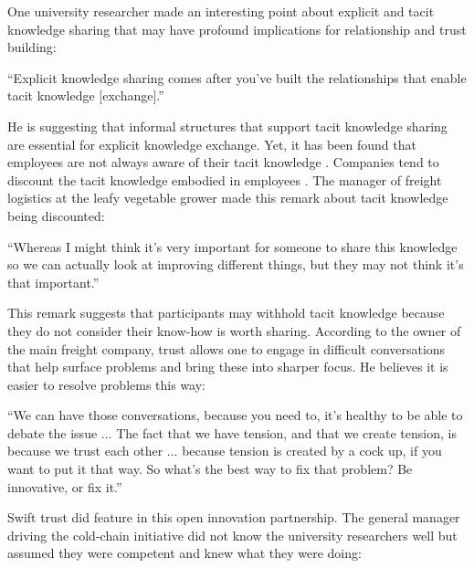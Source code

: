 One university researcher made an interesting point about explicit and tacit knowledge sharing that may have profound implications for relationship and trust building:

\begin{displayquote}[Participant 15/1]
\small
\enquote{Explicit knowledge sharing comes after you've built the relationships that enable tacit knowledge [exchange].} 
\end{displayquote}
 

He is suggesting that informal structures that support tacit knowledge sharing are essential for explicit knowledge exchange. Yet, it has been found that employees are not always aware of their tacit knowledge \citep{polanyi1966tacit, horvath2000working}. Companies tend to discount the tacit knowledge embodied in employees \citep{mcadam2007exploring}. The manager of freight logistics at the leafy vegetable grower made this remark about tacit knowledge being discounted:

\begin{displayquote}[Participant 3/1]
\small
\enquote{Whereas I might think it's very important for someone to share this knowledge so we can actually look at improving different things, but they may not think it's that important.} 
\end{displayquote}
 

This remark suggests that participants may withhold tacit knowledge because they do not consider their know-how is worth sharing. According to the owner of the main freight company, trust allows one to engage in difficult conversations that help surface problems and bring these into sharper focus. He believes it is easier to resolve problems this way:   

\begin{displayquote}[Participant 8/1]
\small
\enquote{We can have those conversations, because you need to, it's healthy to be able to debate the issue ... The fact that we have tension, and that we create tension, is because we trust each other ... because tension is created by a cock up, if you want to put it that way. So what's the best way to fix that problem? Be innovative, or fix it.} 
\end{displayquote}
 

Swift trust did feature in this open innovation partnership. The general manager driving the cold-chain initiative did not know the university researchers well but assumed they were competent and knew what they were doing:

